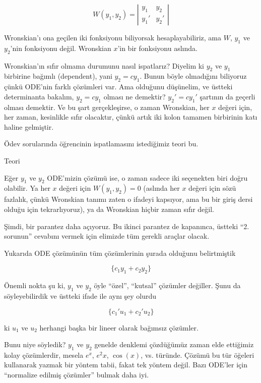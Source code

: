 \documentclass[12pt,fleqn]{article}\usepackage{../../common}
\begin{document}
$$ W(y_1, y_2) = 
\left|\begin{array}{rr}
y_1 & y_2 \\
y_1' & y_2'
\end{array}\right|
 $$

Wronskian'ı ona geçilen iki fonksiyonu biliyorsak hesaplayabiliriz, ama
$W$, $y_1$ ve $y_2$'nin fonksiyonu değil. Wronskian $x$'in bir fonksiyonu
aslında. 

Wronskian'ın sıfır olmama durumunu nasıl ispatlarız? Diyelim ki $y_2$ ve
$y_1$ birbirine bağımlı (dependent), yani $y_2 = cy_1$. Bunun böyle
olmadığını biliyoruz çünkü ODE'nin farklı çözümleri var. Ama olduğunu
düşünelim, ve üstteki determinanta bakalım, $y_2 = cy_1$ olması ne
demektir?  $y_2' = cy_1'$ şartının da geçerli olması demektir. Ve bu şart
gerçekleşirse, o zaman Wronskian, her $x$ değeri için, her zaman,
kesinlikle sıfır olacaktır, çünkü artık iki kolon tamamen birbirinin katı
haline gelmiştir.

Ödev sorularında öğrencinin ispatlamasını istediğimiz teori bu. 

Teori

Eğer $y_1$ ve $y_2$ ODE'mizin çözümü ise, o zaman sadece iki seçenekten
biri doğru olabilir. Ya her $x$ değeri için $W(y_1,y_2) = 0$ (aslında her
$x$ değeri için sözü fazlalık, çünkü Wronskian tanımı zaten o ifadeyi
kapsıyor, ama bu bir giriş dersi olduğu için tekrarlıyoruz), ya da
Wronskian hiçbir zaman sıfır değil.

Şimdi, bir parantez daha açıyoruz. Bu ikinci parantez de kapanınca, üstteki
``2. sorunun'' cevabını vermek için elimizde tüm gerekli araçlar olacak. 

Yukarıda ODE çözümünün tüm çözümlerinin şurada olduğunu belirtmiştik

$$ \bigg\{ c_1y_1 + c_2y_2 \bigg\} $$

Önemli nokta şu ki, $y_1$ ve $y_2$ öyle ``özel'', ``kutsal'' çözümler
değiller. Şunu da söyleyebilirdik ve üstteki ifade ile aynı şey olurdu

$$ \bigg\{ c_1'u_1 + c_2'u_2 \bigg\} $$

ki $u_1$ ve $u_2$ herhangi başka bir lineer olarak bağımsız çözümler. 

Bunu niye söyledik? $y_1$ ve $y_2$ genelde denklemi çözdüğümüz zaman elde
ettiğimiz kolay çözümlerdir, mesela $e^x$, $e^2x$, $\cos(x)$,
vs. türünde. Çözümü bu tür öğeleri kullanarak yazmak bir yöntem tabii,
fakat tek yöntem değil. Bazı ODE'ler için ``normalize edilmiş çözümler''
bulmak daha iyi. 
\end{document}
